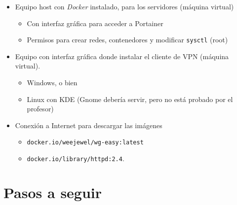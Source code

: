 \documentclass[a4paper]{article}
\begin{document}
\begin{itemize}
\item Equipo host con \emph{Docker} instalado, para los servidores (máquina virtual)
\begin{itemize}
\item Con interfaz gráfica para acceder a Portainer
\item Permisos para crear redes, contenedores y modificar \texttt{sysctl} (root)
\end{itemize}
\item Equipo con interfaz gráfica donde instalar el cliente de VPN (máquina virtual).
\begin{itemize}
\item Windows, o bien
\item Linux con KDE (Gnome debería servir, pero no está probado por el profesor)
\end{itemize}
\item Conexión a Internet para descargar las imágenes
\begin{itemize}
\item \texttt{docker.io/weejewel/wg-easy:latest}
\item \texttt{docker.io/library/httpd:2.4}.
\end{itemize}
\end{itemize}
\section{Pasos a seguir}
\label{sec:org0000009}
\end{document}
